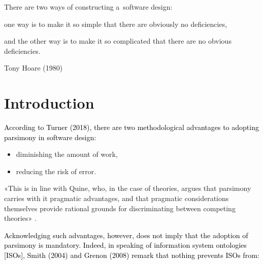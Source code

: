 There are two ways of constructing a~software design:





one way is to make it so simple that there are obviously no deficiencies,





and the other way is to make it so complicated that there are no obvious deficiencies.





Tony Hoare (1980)





\section{Introduction}

\textcolor{black}{According to Turner }\label{ref:RNDV1PAblDjhO}\textcolor{black}{(2018)}\textcolor{black}{, there are two methodological advantages to adopting }\textcolor{black}{parsimony in software design}\textcolor{black}{:}



\begin{itemize}

\item diminishing the amount of work,

\item reducing the risk of error.

\end{itemize}

«This is in line with Quine, who, in the case of theories, argues that parsimony carries with it pragmatic advantages, and that pragmatic considerations themselves provide rational grounds for discriminating between competing theories» 
\parencite[][p.139]{turner_computational_2018}.%




\textcolor{black}{Acknowledging such advantages, however, does not imply that the adoption of }\textcolor{black}{parsimony }\textcolor{black}{is mandatory. Indeed, in speaking of information system ontologies [ISOs], Smith }\label{ref:RNDXcl4PsYojm}\textcolor{black}{(2004)}\textcolor{black}{ and Grenon }\label{ref:RNDukQSlXBJb6}\textcolor{black}{(2008)}\textcolor{black}{ remark that nothing prevents ISOs from: }



